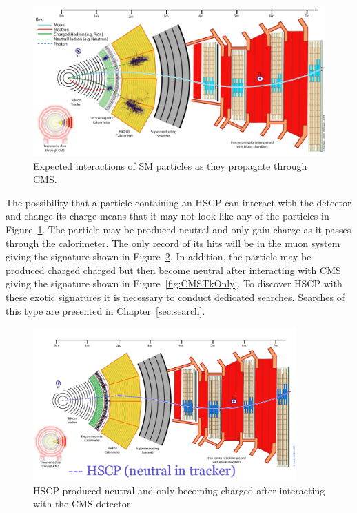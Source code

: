 \begin{figure}
  \begin{center}
      \includegraphics[clip=true, trim=0.0cm 0cm 3.0cm 0cm, width=\textwidth]{figures/apparatus/CMS_Slice.png}
        \caption{Expected interactions of SM particles as they propagate through CMS.
        }
      \label{fig:CMSSlice}
  \end{center}
\end{figure}

The possibility that a particle containing an HSCP can interact with the detector and change its charge
means that it may not look like any of the particles in Figure~\ref{fig:CMSSlice}. The particle
may be produced neutral and only gain charge as it passes through the calorimeter. The only record of its hits will be in the muon system giving the signature shown in
Figure~\ref{fig:CMSMuOnly}. In addition, the particle may be produced charged charged but then become neutral after interacting with CMS giving the signature shown in
Figure~\ref{fig:CMSTkOnly}. To discover HSCP with these exotic signatures it is necessary to conduct dedicated searches.
Searches of this type are presented in Chapter~\ref{sec:search}.



\begin{figure}
  \begin{center}
      \includegraphics[clip=true, trim=0.0cm 0cm 3.0cm 0cm, width=0.9\textwidth]{figures/apparatus/ParticleInCMS_0009_Becoming_Charged}
      \caption[HSCP produced neutral and only becoming charged after interacting with the CMS detector.]
        {HSCP produced neutral and only becoming charged after interacting with the CMS detector.
	 }
      \label{fig:CMSMuOnly}
  \end{center}
\end{figure}

